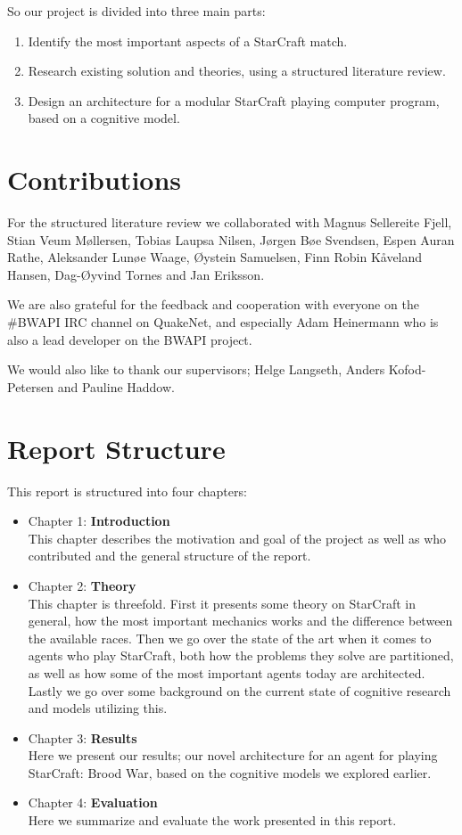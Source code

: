 So our project is divided into three main parts:
\begin{enumerate}
  \item Identify the most important aspects of a StarCraft match.
  \item Research existing solution and theories, using a structured literature
review.
  \item Design an architecture for a modular StarCraft playing computer
program, based on a cognitive model.
\end{enumerate}

\section{Contributions}
For the structured literature review we collaborated with Magnus Sellereite
Fjell, Stian Veum M{\o}llersen, Tobias Laupsa Nilsen, J{\o}rgen B{\o}e Svendsen,
Espen Auran Rathe, Aleksander Lun{\o}e Waage, {\O}ystein Samuelsen, Finn Robin
K{\aa}veland Hansen, Dag-{\O}yvind Tornes and Jan Eriksson.

We are also grateful for the feedback and cooperation with everyone on the
\#BWAPI IRC channel on QuakeNet, and especially Adam Heinermann who is also a
lead developer on the BWAPI project.

We would also like to thank our supervisors; Helge Langseth, Anders
Kofod-Petersen and Pauline Haddow.

\section{Report Structure}
This report is structured into four chapters:
\begin{itemize}
\item Chapter 1: \textbf{Introduction} \\
This chapter describes the motivation and goal of the project as well as who contributed and the general structure of the report.
\item Chapter 2: \textbf{Theory} \\
This chapter is threefold. First it presents some theory on StarCraft in
general, how the most important mechanics works and the difference between the
available races. Then we go over the state of the art when it comes to agents
who play StarCraft, both how the problems they solve are partitioned, as well
as how some of the most important agents today are architected. Lastly we go
over some background on the current state of cognitive research and models
utilizing this.
\item Chapter 3: \textbf{Results} \\
Here we present our results; our novel architecture for an agent for playing
StarCraft: Brood War, based on the cognitive models we explored earlier.
\item Chapter 4: \textbf{Evaluation} \\
Here we summarize and evaluate the work presented in this report.




\end{itemize}
